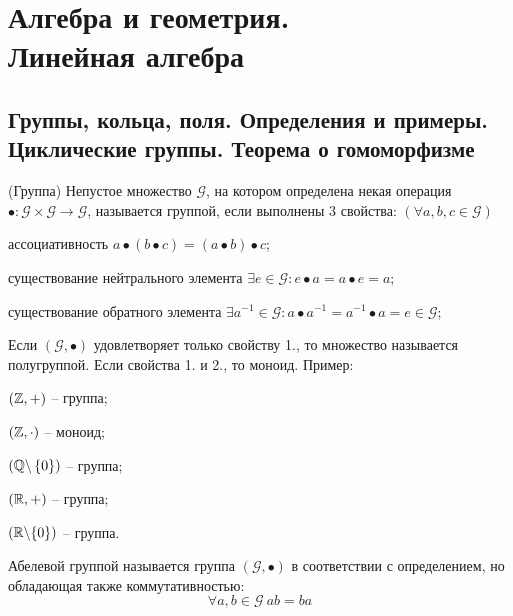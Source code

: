 \chapter{Алгебра и геометрия. \\ \hfill Линейная алгебра}

\begin{multicols}{2}
\raggedcolumns 

\section{Группы, кольца, поля. Определения и примеры. Циклические группы. Теорема о гомоморфизме}

\begin{definition}{(Группа)}{}
    Непустое множество $\mathcal{G}$, на котором определена некая операция $\bullet: \mathcal{G} \times \mathcal{G} \to \mathcal{G}$, называется группой, если выполнены 3 свойства: $(\forall a,b,c \in \mathcal{G})$
    \begin{enumerate*}
        \item ассоциативность $a\bullet(b\bullet c) = (a\bullet b)\bullet c$;
        \item существование нейтрального элемента $\exists e \in \mathcal{G}: e\bullet a = a\bullet e = a$;
        \item существование обратного элемента $\exists a^{-1}\in \mathcal{G} : a\bullet a^{-1} = a^{-1}\bullet a = e\in \mathcal{G}$;
    \end{enumerate*}  
\end{definition}
Если $(\mathcal{G}, \bullet)$ удовлетворяет только свойству 1., то множество называется полугруппой. Если свойства 1. и 2., то моноид.
Пример: 
\begin{multicols}{2}
    \begin{enumerate*}
    \item $\left(\mathbb{Z}, +\right)$ -- группа;
    \item $\left(\mathbb{Z}, \cdot\right)$ -- моноид;
    \item $\left(\mathbb{Q}\backslash \left\{0\right\}\right)$ -- группа;
    \item $\left(\mathbb{R}, +\right)$ -- группа;
    \item $\left(\mathbb{R} \backslash \{0\}\right)$ -- группа.
\end{enumerate*}
\end{multicols}
\begin{note}
    Абелевой группой называется группа $(\mathcal{G}, \bullet)$ в соответствии с определением, но обладающая также коммутативностью: \[\forall a,b \in \mathcal{G} \ ab = ba\]

\end{note}
\end{multicols}
